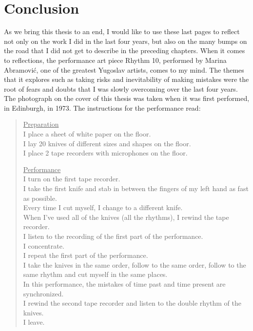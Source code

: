 \chapter{Conclusion}
\label{ch:conclusion}
 
As we bring this thesis to an end, I would like to use these last pages to
reflect not only on the work I did in the last four years, but also on the
many bumps on the road that I did not get to describe in the preceding chapters.
When it comes to reflections, the  performance art piece Rhythm 10, performed by
Marina Abramovi\'c,  one of the greatest Yugoslav artists, comes to my mind. The
themes that it explores such as taking risks and inevitability of making
mistakes were the root of fears and doubts that I was slowly overcoming over the
last four years. The photograph on the cover of this thesis was taken when it
was first performed, in Edinburgh, in 1973. The instructions for the performance read:

\begin{quote}
    \underline{Preparation} \\[1\jot]
    I place a sheet of white paper on the floor.\\
    I lay 20 knives of different sizes and shapes on the floor.\\
    I place 2 tape recorders with microphones on the floor.
    
    \underline{Performance} \\[1\jot]
    I turn on the first tape recorder.\\
    I take the first knife and stab in between the fingers of my left hand as
    fast as possible.\\
    Every time I cut myself, I change to a different knife. \\
    When I've used all of the knives (all the rhythms), I rewind the tape
    recorder. \\ 
    I listen to the recording of the first part of the performance. \\ I
    concentrate. \\
    I repeat the first part of the performance. \\
    I take the knives in the same order, follow to the same order, follow to the
    same rhythm and cut myself in the same places. \\
    In this performance, the mistakes of time past and time present are
    synchronized.\\
    I rewind the second tape recorder and listen to the double rhythm of the
    knives.\\
    I leave.
\end{quote}

